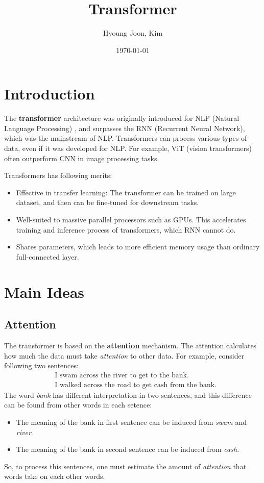 \documentclass{article}
\title{Transformer}
\author{Hyoung Joon, Kim}
\date{\today}
\begin{document}
\maketitle
\tableofcontents
\newpage

\section{Introduction}
    The \textbf{transformer} architecture was originally introduced for NLP (Natural Language Processing)
    , and surpasses the RNN (Recurrent Neural Network), which was the mainstream of NLP. Transformers can
    process various types of data, even if it was developed for NLP. For example, ViT (vision transformers)
    often outperform CNN in image processing tasks.

    Transformers has following merits:
    \begin{itemize}
        \item Effective in transfer learning: The transformer can be trained on large dataset, and then can be fine-tuned for downstream tasks.
        \item Well-suited to massive parallel processors such as GPUs. This accelerates training and inference process of transformers, which RNN cannot do.
        \item Shares parameters, which leads to more efficient memory usage than ordinary full-connected layer.
    \end{itemize}

\section{Main Ideas}
    \subsection{Attention}
        The transformer is based on the \textbf{attention} mechanism. The attention calculates how much the data must
        take \emph{attention} to other data. For example, consider following two sentences:
        \begin{align*}
            &\text{I swam across the river to get to the bank.} \\
            &\text{I walked across the road to get cash from the bank.}
        \end{align*}
        The word \emph{bank} has different interpretation in two sentences, and this difference
        can be found from other words in each setence:
        \begin{itemize}
            \item The meaning of the bank in first sentence can be induced from \emph{swam} and \emph{river}.
            \item The meaning of the bank in second sentence can be induced from \emph{cash}.
        \end{itemize}
        So, to process this sentences, one must estimate the amount of \emph{attention} that words take on each other words.
        
\end{document}
